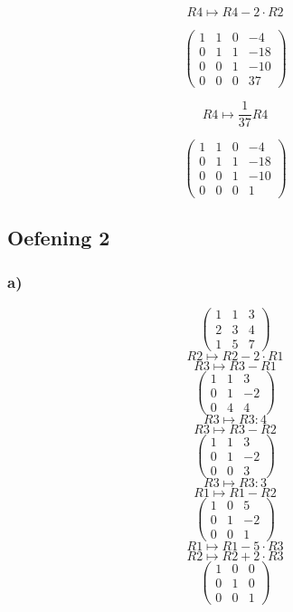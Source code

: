 \documentclass[lineaire_algebra_oplossingen.tex]{subfiles}
\begin{document}
$$R4 \longmapsto R4 - 2\cdot R2$$

$$
\begin{pmatrix}
1 & 1 & 0 & -4\\
0 & 1 & 1 & -18\\
0 & 0 & 1 & -10\\
0 & 0 & 0 & 37
\end{pmatrix}
$$

$$R4 \longmapsto \frac{1}{37} R4$$

$$
\begin{pmatrix}
1 & 1 & 0 & -4\\
0 & 1 & 1 & -18\\
0 & 0 & 1 & -10\\
0 & 0 & 0 & 1
\end{pmatrix}
$$
\subsection{Oefening 2}
\subsubsection*{a)}
\[
\begin{pmatrix}
1 &  1 &  3\\
2 &  3 &  4\\
1 &  5 &  7
\end{pmatrix}
\]
\[ R2 \longmapsto R2 -2\cdot R1\]
\[ R3 \longmapsto R3 - R1\]
\[
\begin{pmatrix}
1 &  1 &  3\\
0 &  1 &  -2\\
0 &  4 &  4
\end{pmatrix}
\]
\[ R3 \longmapsto R3:4\]
\[ R3 \longmapsto R3 - R2\]
\[
\begin{pmatrix}
1 &  1 &  3\\
0 &  1 &  -2\\
0 &  0 &  3
\end{pmatrix}
\]
\[ R3 \longmapsto R3:3\]
\[ R1 \longmapsto R1 - R2\]
\[
\begin{pmatrix}
1 &  0 &  5\\
0 &  1 &  -2\\
0 &  0 &  1
\end{pmatrix}
\]
\[ R1 \longmapsto R1 -5\cdot R3\]
\[ R2 \longmapsto R2 +2\cdot R3\]
\[
\begin{pmatrix}
1 &  0 &  0\\
0 &  1 &  0\\
0 &  0 &  1
\end{pmatrix}
\]
\end{document}
